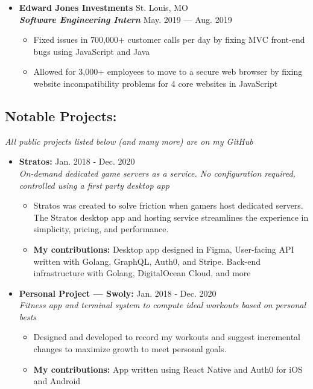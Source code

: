 \documentclass[9pt,oneside]{memoir}
\begin{document}
\begin{itemize}
      \item[] \textbf{Edward Jones Investments}
            \hfill St. Louis, MO\\
            \textit{\textbf{Software Engineering Intern}}
            \hfill May. 2019 --- Aug. 2019
            \begin{itemize}
                  \item[\textbullet] Fixed issues in 700,000+ customer calls per day by fixing MVC front-end bugs using JavaScript and Java
                  \item[\textbullet] Allowed for 3,000+ employees to move to a secure web browser by fixing website incompatibility problems for 4 core websites in JavaScript
            \end{itemize}

      
\end{itemize}

\vspace*{-11px}
\subsection*{Notable Projects:}
\vspace*{-4px}
\textit{All public projects listed below (and many more) are on my GitHub}
\begin{itemize}

      \item[] \textbf{Stratos:}
            \hfill Jan. 2018 - Dec. 2020\\
            \textit{On-demand dedicated game servers as a service. No configuration required, controlled using a first party desktop app}
            \begin{itemize}
                  \item[\textbullet] Stratos was created to solve friction when gamers host dedicated servers. The Stratos desktop app and hosting service streamlines the experience in simplicity, pricing, and performance.
                  \item[\textbullet] \textbf{My contributions:} Desktop app designed in Figma, User-facing API written with Golang, GraphQL, Auth0, and Stripe. Back-end infrastructure with Golang, DigitalOcean Cloud, and more
            \end{itemize}
            
      \item[] \textbf{Personal Project --- Swoly:}
            \hfill Jan. 2018 - Dec. 2020\\
            \textit{Fitness app and terminal system to compute ideal workouts based on personal bests}
            \begin{itemize}
                  \item[\textbullet] Designed and developed to record my workouts and suggest incremental changes to maximize growth to meet personal goals.
                  \item[\textbullet] \textbf{My contributions:} App written using React Native and Auth0 for iOS and Android
            \end{itemize}
\end{itemize}
\end{document}
